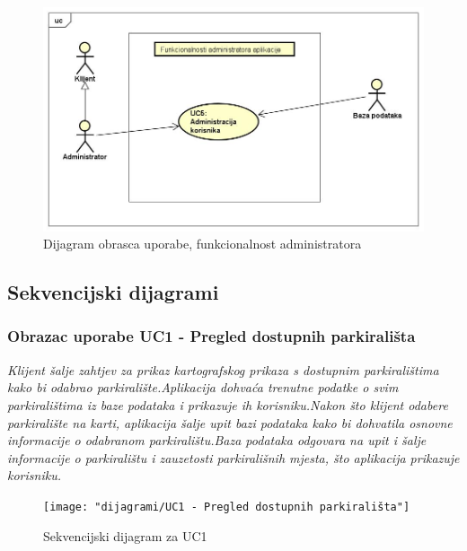 \begin{figure}[!htb]
	\centering
	\includegraphics[width=1\linewidth]{dijagrami/dijagramAdmin}
	\caption{Dijagram obrasca uporabe, funkcionalnost administratora}
	\label{fig:dijagramadmin}
\end{figure}




\newpage
	
\subsection{Sekvencijski dijagrami}

\subsubsection{Obrazac uporabe UC1 - Pregled dostupnih parkirališta}

\textit{Klijent šalje zahtjev za prikaz kartografskog prikaza s dostupnim parkiralištima kako bi odabrao parkiralište.Aplikacija dohvaća trenutne podatke o svim parkiralištima iz baze podataka i prikazuje ih korisniku.Nakon što klijent odabere parkiralište na karti, aplikacija šalje upit bazi podataka kako bi dohvatila osnovne informacije o odabranom parkiralištu.Baza podataka odgovara na upit i šalje informacije o parkiralištu i zauzetosti parkirališnih mjesta, što aplikacija prikazuje korisniku.}

\newpage

\begin{figure}
	\centering
	\texttt{[image: "dijagrami/UC1 - Pregled dostupnih parkirališta"]}
	\caption{Sekvencijski dijagram za UC1}
	\label{fig:uc1---pregled-dostupnih-parkiralista}
\end{figure}


